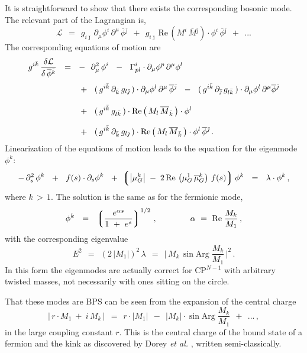 \documentclass[epsfig,12pt]{article}
\def\beq{\begin{equation}}
\def\eeq{\end{equation}}
\def\beq{\begin{equation}}
\def\eeq{\end{equation}}
\newcommand{\p}{\partial}
\newcommand{\ov}{\overline}
\newcommand{\mc}[1]{\mathcal{#1}}
\newcommand{\lgr}{\left\lgroup}
\newcommand{\rgr}{\right\rgroup}
\newcommand{\bphi}{\ov{\phi}{}}
\newcommand{\bj}{{\bar \jmath}}
\newcommand{\bk}{{\bar k}}
\begin{document}
	It is straightforward to show that there exists the corresponding bosonic mode. 
	The relevant part of the Lagrangian is,
\beq
	\mc{L} ~~=~~ g_{i\bj}\, \p_\mu \phi^i\, \p^\mu\, \bphi{}^\bj 
	       ~~+~~ g_{i\bj}\, \text{Re}\, ( M^i\, \ov{M}{}^\bj ) \cdot \phi^i\, \bphi^\bj ~~+~~ ...
\eeq
	The corresponding equations of motion are
\begin{align}
%
\notag
	g^{i\bk}\, \frac{\delta \mc{L}}
                        {\delta\, \bphi{}^\bk} 
	& ~~=~~
	-~~ \p_\mu^2\, \phi^i 
	~~-~~ \Gamma^i_{pl} \cdot \p_\mu \phi^p\, \p^\mu \phi^l
	\\[1mm]
%
	&~~~~~~
	~~+~~
	(\, g^{i\bk}\, \p_{\bk}\, g_{l\bj} \,) \cdot \p_\mu \phi^l\, \p^\mu\, \bphi{}^\bj 
	~~-~~ (\, g^{i\bk}\, \p_\bj\, g_{l\bk} \,) \cdot \p_\mu \phi^l\, \p^\mu \bphi{}^\bj 
	\\[3mm]
%
\notag
	&~~~~~~
	~~+~~ (\, g^{i\bk}\, g_{l\bk} \,) \cdot \text{Re} \left(\, M_l\, \ov{M}{}_{\bk} \,\right) \cdot \phi^l
	\\[2.5mm]
%
\notag
	&~~~~~~
	~~+~~ (\, g^{i\bk}\, \p_\bk\, g_{l\bj} \,) \cdot 
		\text{Re} \left(\, M_l\, \ov{M}{}_{\bk} \,\right) \cdot \phi^l\, \bphi{}^\bj\,.
\end{align}
	Linearization of the equations of motion leads to the equation for the eigenmode $ \phi^k $:
\beq
	-\, \p_s^2\, \phi^k  ~~+~~ f(s) \cdot \p_s \phi^k ~~+~~ \!\! 
	\lgr \left| \mu_G^k \right| \;-\; 2\, \text{Re}\, \left( \mu_G^1\, \ov{\mu}{}_G^k \right)\, f(s) \rgr \phi^k 
	~~=~~ \lambda \cdot \phi^k\,,
\eeq
	where $ k \,>\, 1 $.
	The solution is the same as for the fermionic mode,
\beq
	\phi^k  ~~=~~  \lgr \frac{  e^{\alpha s}  }
	                         {   1 ~+~ e^s    }  \rgr^{ 1/2 }\,,
	\qquad\qquad
	\alpha ~=~ \text{Re}\; \frac{M_k}{M_1}\,,
\eeq
	with the corresponding eigenvalue
\beq
	E^2 ~~=~~ \left( 2\, | M_1 | \right)^2\, \lambda ~~=~~ \Big|\, M_k\, \sin \text{Arg}\; \frac{ M_k }{ M_1 } \,\Big|^2\,.
\eeq
	In this form the eigenmodes are actually correct for CP$^{N-1}$ with arbitrary twisted masses,
	not necessarily with ones sitting on the circle.

	That these modes are BPS can be seen from the expansion of the central charge
\beq
       |\, r \cdot M_1  ~+~ i\, M_k \,|  ~~=~~ r \cdot | M_1 |  ~~-~~ | M_k | \cdot \sin \text{Arg}\; \frac { M_k } 
                                                                                                            { M_1 }  
                                                                ~~+~~ ... \,,
\eeq
	in the large coupling constant $ r $.
	This is the central charge of the bound state of a fermion and the kink 
	as discovered by Dorey {\it et al.} \cite{Dorey:1999zk}, written semi-classically.
\end{document}
